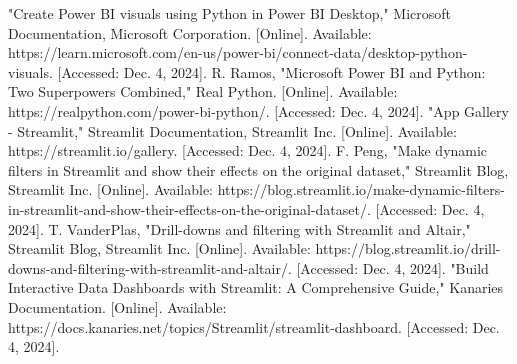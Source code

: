 \documentclass[conference]{IEEEtran}
\begin{document}
\begin{thebibliography}{00}
 "Create Power BI visuals using Python in Power BI Desktop," Microsoft Documentation, Microsoft Corporation. [Online]. Available: https://learn.microsoft.com/en-us/power-bi/connect-data/desktop-python-visuals. [Accessed: Dec. 4, 2024].
 R. Ramos, "Microsoft Power BI and Python: Two Superpowers Combined," Real Python. [Online]. Available: https://realpython.com/power-bi-python/. [Accessed: Dec. 4, 2024].
 "App Gallery - Streamlit," Streamlit Documentation, Streamlit Inc. [Online]. Available: https://streamlit.io/gallery. [Accessed: Dec. 4, 2024].
 F. Peng, "Make dynamic filters in Streamlit and show their effects on the original dataset," Streamlit Blog, Streamlit Inc. [Online]. Available: https://blog.streamlit.io/make-dynamic-filters-in-streamlit-and-show-their-effects-on-the-original-dataset/. [Accessed: Dec. 4, 2024].
 T. VanderPlas, "Drill-downs and filtering with Streamlit and Altair," Streamlit Blog, Streamlit Inc. [Online]. Available: https://blog.streamlit.io/drill-downs-and-filtering-with-streamlit-and-altair/. [Accessed: Dec. 4, 2024].
 "Build Interactive Data Dashboards with Streamlit: A Comprehensive Guide," Kanaries Documentation. [Online]. Available: https://docs.kanaries.net/topics/Streamlit/streamlit-dashboard. [Accessed: Dec. 4, 2024].
\end{thebibliography}
\end{document}
